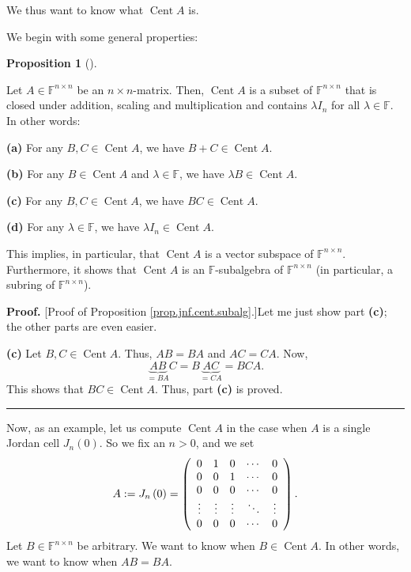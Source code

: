 \documentclass[numbers=enddot,12pt,final,onecolumn,notitlepage]{scrartcl}%
\numberwithin{exer}{subsection}
\theoremstyle{definition}
\newtheorem{prop}[theo]{Proposition}
\newenvironment{proposition}[1][]
{\begin{prop}[#1]\begin{leftbar}}
{\end{leftbar}\end{prop}}
\newenvironment{proof}[1][Proof]{\noindent\textbf{#1.} }{\ \rule{0.5em}{0.5em}}
\begin{document}
We thus want to know what $\operatorname*{Cent}A$ is.

We begin with some general properties:

\begin{proposition}
\label{prop.jnf.cent.subalg}Let $A\in\mathbb{F}^{n\times n}$ be an $n\times
n$-matrix. Then, $\operatorname*{Cent}A$ is a subset of $\mathbb{F}^{n\times
n}$ that is closed under addition, scaling and multiplication and contains
$\lambda I_{n}$ for all $\lambda\in\mathbb{F}$. In other words:

\textbf{(a)} For any $B,C\in\operatorname*{Cent}A$, we have $B+C\in
\operatorname*{Cent}A$.

\textbf{(b)} For any $B\in\operatorname*{Cent}A$ and $\lambda\in\mathbb{F}$,
we have $\lambda B\in\operatorname*{Cent}A$.

\textbf{(c)} For any $B,C\in\operatorname*{Cent}A$, we have $BC\in
\operatorname*{Cent}A$.

\textbf{(d)} For any $\lambda\in\mathbb{F}$, we have $\lambda I_{n}%
\in\operatorname*{Cent}A$.
\end{proposition}

This implies, in particular, that $\operatorname*{Cent}A$ is a vector subspace
of $\mathbb{F}^{n\times n}$. Furthermore, it shows that $\operatorname*{Cent}%
A$ is an $\mathbb{F}$-subalgebra of $\mathbb{F}^{n\times n}$ (in particular, a
subring of $\mathbb{F}^{n\times n}$).

\begin{proof}
[Proof of Proposition \ref{prop.jnf.cent.subalg}.]Let me just show part
\textbf{(c)}; the other parts are even easier.

\textbf{(c)} Let $B,C\in\operatorname*{Cent}A$. Thus, $AB=BA$ and $AC=CA$.
Now,%
\[
\underbrace{AB}_{=BA}C=B\underbrace{AC}_{=CA}=BCA.
\]
This shows that $BC\in\operatorname*{Cent}A$. Thus, part \textbf{(c)} is proved.
\end{proof}

Now, as an example, let us compute $\operatorname*{Cent}A$ in the case when
$A$ is a single Jordan cell $J_{n}\left(  0\right)  $. So we fix an $n>0$, and
we set%
\[
A:=J_{n}\left(  0\right)  =\left(
\begin{array}
[c]{ccccc}%
0 & 1 & 0 & \cdots & 0\\
0 & 0 & 1 & \cdots & 0\\
0 & 0 & 0 & \cdots & 0\\
\vdots & \vdots & \vdots & \ddots & \vdots\\
0 & 0 & 0 & \cdots & 0
\end{array}
\right)  .
\]
Let $B\in\mathbb{F}^{n\times n}$ be arbitrary. We want to know when
$B\in\operatorname*{Cent}A$. In other words, we want to know when $AB=BA$.
\end{document}
